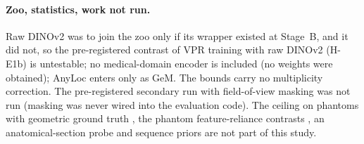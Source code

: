 \paragraph{Zoo, statistics, work not run.} Raw DINOv2 was to join the zoo
only if its wrapper existed at Stage~B, and it did not, so the pre-registered
contrast of VPR training with raw DINOv2 (H-E1b) is untestable; no medical-domain encoder is included (no weights were obtained);
AnyLoc enters only as GeM. The bounds carry no multiplicity correction.
The pre-registered secondary run with field-of-view
masking was not run (masking was never wired into the evaluation code). The ceiling on phantoms with geometric ground truth
, the phantom feature-reliance
contrasts , an anatomical-section probe
 and sequence priors  are not
part of this study.

